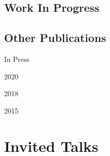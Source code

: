 \documentclass[12pt,letterpaper]{report}
\begin{document}
    \subsection*{Work In Progress}
    
    \begin{tablist}
    \item[\the\year] \tab{}
    \item[\the\year] \tab{}
    \item[\the\year] \tab{}
    \item[\the\year] \tab{}
    \end{tablist}

    \subsection*{Other Publications}
    \begin{tablist}
    \item[In Press]     \tab{}
    \item[2020] \tab{}
    \item[2018] \tab{}
    \item[2015] \tab{}
    \end{tablist}
    
    \section*{Invited Talks}
\end{document}
